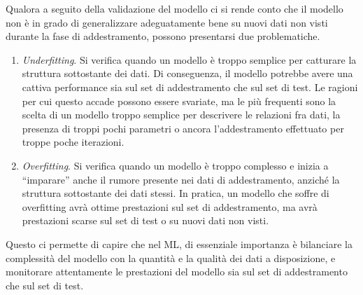\documentclass[12pt,a4paper,twoside,openright]{book}
\begin{document}
Qualora a seguito della validazione del modello ci si rende conto che il modello non è in grado di generalizzare adeguatamente bene su nuovi dati non visti durante la fase di addestramento, possono presentarsi due problematiche.
\begin{enumerate}
    \item \emph{Underfitting}. Si verifica quando un modello è troppo semplice per catturare la struttura sottostante dei dati. Di conseguenza, il modello potrebbe avere una cattiva performance sia sul set di addestramento che sul set di test. Le ragioni per cui questo accade possono essere svariate, ma le più frequenti sono la scelta di un modello troppo semplice per descrivere le relazioni fra dati, la presenza di troppi pochi parametri o ancora l'addestramento effettuato per troppe poche iterazioni.
    \item \emph{Overfitting}. Si verifica quando un modello è troppo complesso e inizia a ``imparare'' anche il rumore presente nei dati di addestramento, anziché la struttura sottostante dei dati stessi. In pratica, un modello che soffre di overfitting avrà ottime prestazioni sul set di addestramento, ma avrà prestazioni scarse sul set di test o su nuovi dati non visti.
\end{enumerate}

Questo ci permette di capire che nel ML, di essenziale importanza è bilanciare la complessità del modello con la quantità e la qualità dei dati a disposizione, e monitorare attentamente le prestazioni del modello sia sul set di addestramento che sul set di test.
\end{document}
